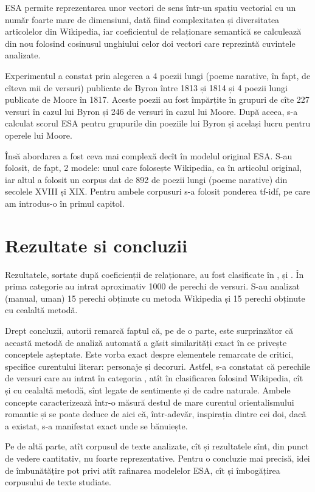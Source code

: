 ESA permite reprezentarea unor vectori de sens într-un spațiu vectorial cu
un număr foarte mare de dimensiuni, dată fiind complexitatea și diversitatea
articolelor din Wikipedia, iar coeficientul de relaționare semantică se
calculează din nou folosind cosinusul unghiului celor doi vectori care
reprezintă cuvintele analizate.

Experimentul a constat prin alegerea a 4 poezii lungi (poeme narative, în fapt,
de cîteva mii de versuri) publicate de Byron între 1813 și 1814 și 4 poezii lungi
publicate de Moore în 1817. Aceste poezii au fost împărțite în grupuri de cîte
227 versuri în cazul lui Byron și 246 de versuri în cazul lui Moore. După aceea,
s-a calculat scorul ESA pentru grupurile din poeziile lui Byron și același
lucru pentru operele lui Moore.

Însă abordarea a fost ceva mai complexă decît în modelul original ESA. S-au
folosit, de fapt, 2 modele: unul care folosește Wikipedia, ca în articolul
original, iar altul a folosit un corpus dat de 892 de poezii lungi (poeme
narative) din secolele XVIII și XIX. Pentru ambele corpusuri s-a folosit
ponderea tf-idf, pe care am introdus-o în primul capitol.

\section{Rezultate si concluzii}

Rezultatele, sortate după coeficienții de relaționare, au fost clasificate
în ,  și . În prima
categorie au intrat aproximativ 1000 de perechi de versuri. S-au analizat
(manual, uman) 15 perechi obținute cu metoda Wikipedia și 15 perechi
obținute cu cealaltă metodă.

Drept concluzii, autorii remarcă faptul că, pe de o parte, este surprinzător
că această metodă de analiză automată a găsit similarități exact în ce
privește conceptele așteptate. Este vorba exact despre elementele remarcate
de critici, specifice curentului literar: personaje și decoruri. Astfel,
s-a constatat că perechile de versuri care au intrat în categoria
, atît în clasificarea folosind Wikipedia, cît și cu
cealaltă metodă, sînt legate de sentimente și de cadre naturale.
Ambele concepte caracterizează într-o măsură destul de mare curentul
orientalismului romantic și se poate deduce de aici că, într-adevăr,
inspirația dintre cei doi, dacă a existat, s-a manifestat exact unde se
bănuiește.

Pe de altă parte, atît corpusul de texte analizate, cît și rezultatele sînt,
din punct de vedere cantitativ, nu foarte reprezentative. Pentru o concluzie
mai precisă, idei de îmbunătățire pot privi atît rafinarea modelelor ESA,
cît și îmbogățirea corpusului de texte studiate.


